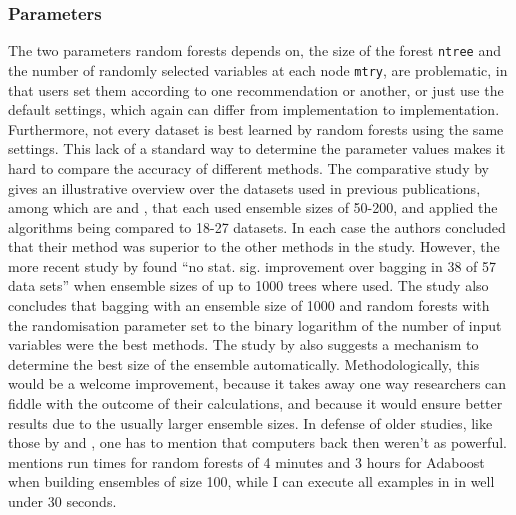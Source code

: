 \documentclass[a4paper,man,12pt,apacite,floatsintext,draftfirst]{apa6} %
\begin{document}
\subsubsection{Parameters}
The two parameters random forests depends on, the size of the forest
\texttt{ntree} and the number of randomly selected variables at each node
\texttt{mtry}, are problematic,
in that users set them according to one recommendation or another,
or just use the default settings, which again can differ from implementation
to implementation.
Furthermore, not every dataset is best learned by random forests using the
same settings.
This lack of a standard way to determine the parameter values makes it hard
to compare the accuracy of different methods.
The comparative study by \cite{banfield2007comparison} gives an
illustrative overview over the datasets used in previous publications,
among which are \cite{breiman2001random} and \cite{dietterich2000ensemble},
that each used ensemble sizes of 50-200, and applied the algorithms being
compared to 18-27 datasets.
In each case the authors concluded that their method was superior to the
other methods in the study.
However, the more recent study by \cite{banfield2007comparison} found
“no stat. sig. improvement over bagging in 38 of 57 data sets”
when ensemble sizes of up to 1000 trees where used.
The study also concludes that bagging with an ensemble size of 1000 and
random forests with the randomisation parameter set to the
binary logarithm of the number of input variables were the best methods.
The study by \cite{banfield2007comparison} also suggests a mechanism
to determine the best size of the ensemble automatically.
Methodologically, this would be a welcome improvement, because it takes
away one way researchers can fiddle with the outcome of their calculations,
and because it would ensure better results due to the usually larger
ensemble sizes.
In defense of older studies, like those by \cite{breiman2001random} and
\cite{dietterich2000ensemble}, one has to mention that
computers back then weren't as powerful.
\cite{breiman2001random} mentions run times for random forests of 4 minutes
and 3 hours for Adaboost when building ensembles of size 100,
while I can execute all examples in \cite{strobl2009introduction}
in well under 30 seconds.
\end{document}
